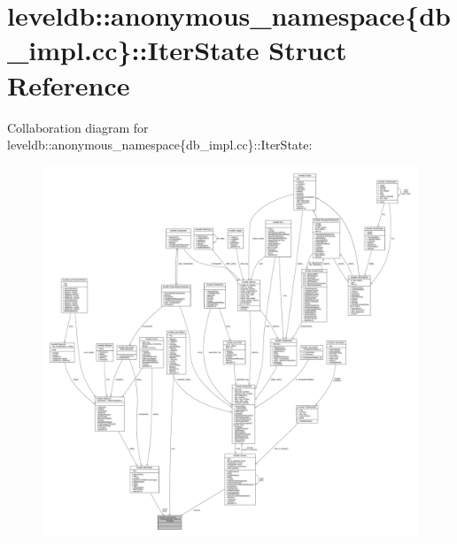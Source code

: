 \hypertarget{structleveldb_1_1anonymous__namespace_02db__impl_8cc_03_1_1_iter_state}{}\section{leveldb\+:\+:anonymous\+\_\+namespace\{db\+\_\+impl.\+cc\}\+:\+:Iter\+State Struct Reference}
\label{structleveldb_1_1anonymous__namespace_02db__impl_8cc_03_1_1_iter_state}


Collaboration diagram for leveldb\+:\+:anonymous\+\_\+namespace\{db\+\_\+impl.\+cc\}\+:\+:Iter\+State\+:
\nopagebreak
\begin{figure}[H]
\begin{center}
\leavevmode
\includegraphics[width=350pt]{structleveldb_1_1anonymous__namespace_02db__impl_8cc_03_1_1_iter_state__coll__graph}
\end{center}
\end{figure}
